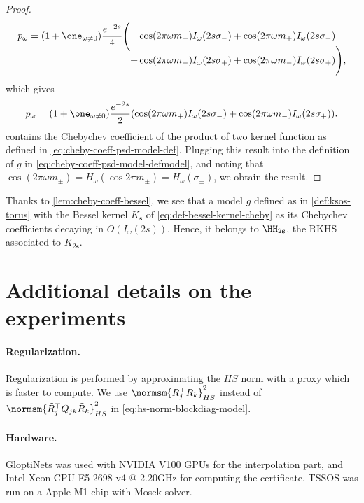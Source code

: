 \documentclass{article}
\begin{document}
\begin{proof}
  \begin{equation*}
    p_\omega = (1 + \one_{\omega \neq 0}) \frac{e^{-2s}}{4} \Biggl(
    \begin{aligned}[t]
        & \cos(2\pi \omega m_+) I_{\omega}(2s \sigma_-)
      + \cos(2\pi \omega m_+) I_{\omega}(2s \sigma_-)   \\
      + & \cos(2\pi \omega m_-) I_{\omega}(2s \sigma_+)
      + \cos(2\pi \omega m_-) I_{\omega}(2s \sigma_+)\Biggr),
    \end{aligned}
  \end{equation*}
  which gives
  \begin{equation}\label{eq:cheby-coeff-psd-model-end}
    p_\omega = (1 + \one_{\omega \neq 0}) \frac{e^{-2s}}{2} (\cos(2\pi \omega m_+) I_{\omega}(2s \sigma_-) + \cos(2\pi \omega m_-) I_{\omega}(2s \sigma_+)).
  \end{equation}
   contains the Chebychev coefficient of the product of two kernel function as defined in \cref{eq:cheby-coeff-psd-model-def}. Plugging this result into the definition of $g$ in \cref{eq:cheby-coeff-psd-model-defmodel}, and noting that $\cos(2\pi \omega m_\pm) = H_\omega(\cos 2\pi m_\pm) = H_\omega(\sigma_\pm)$, we obtain the result.
\end{proof}

Thanks to \cref{lem:cheby-coeff-bessel}, we see that a model $g$ defined as in \cref{def:ksos-torus} with the Bessel kernel $K_{\mathbf{s}}$ of \cref{eq:def-bessel-kernel-cheby} as its Chebychev coefficients decaying in $O(I_\omega(2s))$. Hence, it belongs to $\HH_{2\mathbf{s}}$, the RKHS associated to $K_{2 \mathbf{s}}$.

\section{Additional details on the experiments}
\label{sec:xps-appendix}

\paragraph{Regularization.}
Regularization is performed by approximating the $HS$ norm with a proxy which is faster to compute. We use $\normsm{R_j^\top R_k}_{HS}^2$ instead of $\normsm{\tilde{R}_j^\top Q_{jk} \tilde{R}_k}_{HS}^2$ in \cref{eq:hs-norm-blockdiag-model}.

\paragraph{Hardware.}
GloptiNets was used with NVIDIA V100 GPUs for the interpolation part, and Intel Xeon CPU E5-2698 v4 @ 2.20GHz for computing the certificate. TSSOS was run on a Apple M1 chip with Mosek solver.
\end{document}
